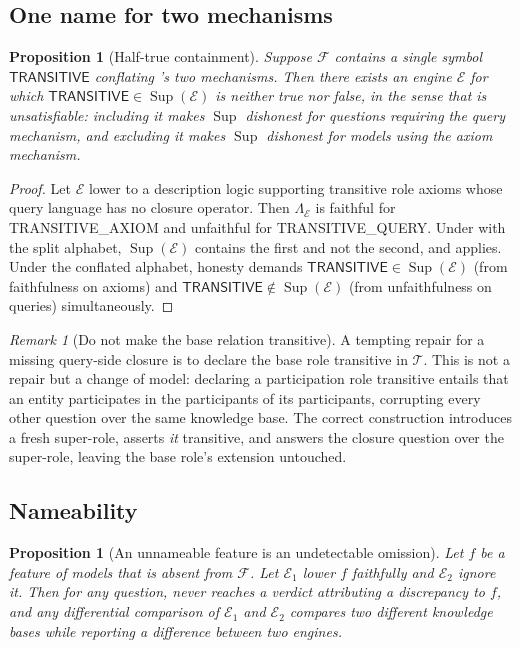 \documentclass[11pt,a4paper]{article}
\theoremstyle{plain}
\newtheorem{proposition}[theorem]{Proposition}
\theoremstyle{definition}
\theoremstyle{remark}
\newtheorem{remark}[theorem]{Remark}
\newcommand{\Engine}{\mathcal{E}}         %
\newcommand{\Feat}{\mathcal{F}}           %
\renewcommand{\sup}{\operatorname{Sup}}   %
\newcommand{\lowr}{\Lambda}               %
\begin{document}
\subsection{One name for two mechanisms}

\begin{proposition}[Half-true containment]
\label{prop:half-true}
Suppose $\Feat$ contains a single symbol $\textsf{TRANSITIVE}$ conflating
's two mechanisms. Then there exists an engine
$\Engine$ for which $\textsf{TRANSITIVE} \in \sup(\Engine)$ is neither true
nor false, in the sense that  is unsatisfiable: including it
makes $\sup$ dishonest for questions requiring the query mechanism, and
excluding it makes $\sup$ dishonest for models using the axiom mechanism.
\end{proposition}

\begin{proof}
Let $\Engine$ lower to a description logic supporting transitive role axioms
whose query language has no closure operator. Then $\lowr_\Engine$ is
faithful for \textsf{TRANSITIVE\_AXIOM} and unfaithful for
\textsf{TRANSITIVE\_QUERY}. Under  with the split alphabet,
$\sup(\Engine)$ contains the first and not the second, and
 applies. Under the conflated alphabet, honesty demands
$\textsf{TRANSITIVE} \in \sup(\Engine)$ (from faithfulness on axioms) and
$\textsf{TRANSITIVE} \notin \sup(\Engine)$ (from unfaithfulness on queries)
simultaneously.
\end{proof}

\begin{remark}[Do not make the base relation transitive]
\label{rem:no-base-transitive}
A tempting repair for a missing query-side closure is to declare the base role
transitive in $\mathcal{T}$. This is not a repair but a change of model:
declaring a participation role transitive entails that an entity participates
in the participants of its participants, corrupting every other question over
the same knowledge base. The correct construction introduces a fresh
super-role, asserts \emph{it} transitive, and answers the closure question over
the super-role, leaving the base role's extension untouched.
\end{remark}

\subsection{Nameability}

\begin{proposition}[An unnameable feature is an undetectable omission]
\label{prop:nameable}
Let $f$ be a feature of models that is absent from $\Feat$. Let $\Engine_1$
lower $f$ faithfully and $\Engine_2$ ignore it. Then for any question,
 never reaches a verdict attributing a discrepancy to
$f$, and any differential comparison of $\Engine_1$ and $\Engine_2$ compares
two different knowledge bases while reporting a difference between two
engines.
\end{proposition}
\end{document}
